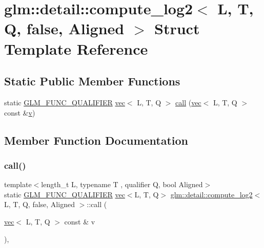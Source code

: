 \hypertarget{structglm_1_1detail_1_1compute__log2_3_01_l_00_01_t_00_01_q_00_01false_00_01_aligned_01_4}{}\section{glm\+:\+:detail\+:\+:compute\+\_\+log2$<$ L, T, Q, false, Aligned $>$ Struct Template Reference}
\label{structglm_1_1detail_1_1compute__log2_3_01_l_00_01_t_00_01_q_00_01false_00_01_aligned_01_4}
\subsection*{Static Public Member Functions}
\begin{DoxyCompactItemize}
\item 
static \mbox{\hyperlink{setup_8hpp_a33fdea6f91c5f834105f7415e2a64407}{G\+L\+M\+\_\+\+F\+U\+N\+C\+\_\+\+Q\+U\+A\+L\+I\+F\+I\+ER}} \mbox{\hyperlink{structglm_1_1vec}{vec}}$<$ L, T, Q $>$ \mbox{\hyperlink{structglm_1_1detail_1_1compute__log2_3_01_l_00_01_t_00_01_q_00_01false_00_01_aligned_01_4_ac62f752297dfcc4f1778e504cce4e305}{call}} (\mbox{\hyperlink{structglm_1_1vec}{vec}}$<$ L, T, Q $>$ const \&\mbox{\hyperlink{_s_d_l__opengl_8h_a10a82eabcb59d2fcd74acee063775f90}{v}})
\end{DoxyCompactItemize}


\subsection{Member Function Documentation}
\mbox{\label{structglm_1_1detail_1_1compute__log2_3_01_l_00_01_t_00_01_q_00_01false_00_01_aligned_01_4_ac62f752297dfcc4f1778e504cce4e305}} 
\subsubsection{\texorpdfstring{call()}{call()}}
{\footnotesize\ttfamily template$<$length\+\_\+t L, typename T , qualifier Q, bool Aligned$>$ \\
static \mbox{\hyperlink{setup_8hpp_a33fdea6f91c5f834105f7415e2a64407}{G\+L\+M\+\_\+\+F\+U\+N\+C\+\_\+\+Q\+U\+A\+L\+I\+F\+I\+ER}} \mbox{\hyperlink{structglm_1_1vec}{vec}}$<$L, T, Q$>$ \mbox{\hyperlink{structglm_1_1detail_1_1compute__log2}{glm\+::detail\+::compute\+\_\+log2}}$<$ L, T, Q, false, Aligned $>$\+::call (\begin{DoxyParamCaption}\item[{\mbox{\hyperlink{structglm_1_1vec}{vec}}$<$ L, T, Q $>$ const \&}]{v }\end{DoxyParamCaption})\hspace{0.3cm}{\ttfamily [inline]}, {\ttfamily [static]}}



